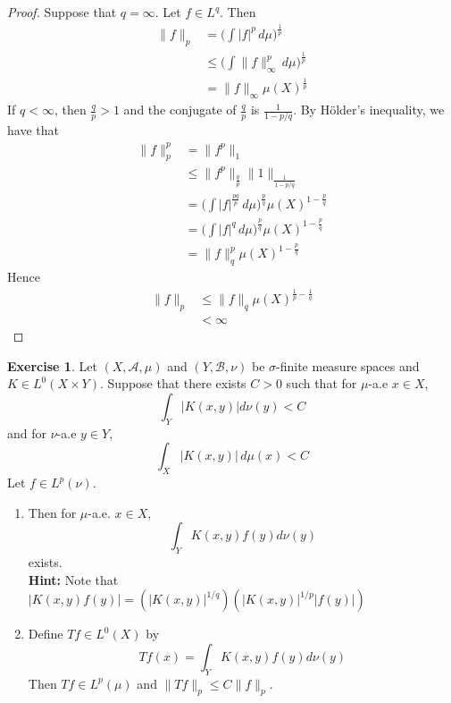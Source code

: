 \documentclass{book}
\theoremstyle{definition}
\newtheorem{ex}[definition]{Exercise}
\newcommand{\sig}{\sigma}
\newcommand{\MA}{\mathcal{A}}
\newcommand{\MB}{\mathcal{B}}
\newcommand{\lex}[1]{\label{ex:#1}}
\DeclareMathOperator*{\0}{\mbf{0}}
\DeclareMathOperator*{\1}{\mbf{1}}
\newcommand{\dmu}{\, d \mu}
\begin{document}
	\begin{proof}
		Suppose that $q = \infty$. Let $f \in L^q$. Then
		\begin{align*}
			\|f \|_p 
			&= \bigg(\int | f |^p \dmu \bigg)^{\frac{1}{p}} \\
			& \leq \bigg(\int \| f \|_{\infty} ^p \dmu \bigg)^{\frac{1}{p}} \\
			&= \|f \|_{\infty} \mu(X)^{\frac{1}{p}}
		\end{align*} 
		If $q < \infty$, then $\frac{q}{p} > 1$ and the conjugate of $\frac{q}{p}$ is $\frac{1}{1- p/q}$. By Hölder's inequality, we have that 
		\begin{align*}
			\|f \|_p^p 
			&= \|f^p \|_1 \\
			&\leq \|f^p \|_{\frac{q}{p}} \|1 \|_{\frac{1}{1-p/q}} \\
			&= \bigg(\int |f|^{\frac{pq}{p}} \dmu \bigg)^{\frac{p}{q}} \mu(X)^{1-\frac{p}{q}} \\
			&= \bigg(\int |f|^{q} \dmu \bigg)^{\frac{p}{q}}\mu(X)^{1-\frac{p}{q}} \\
			&= \|f \|_q^p\mu(X)^{1-\frac{p}{q}}
		\end{align*}
		Hence 
		\begin{align*}
			\|f \|_p 
			&\leq \|f \|_q\mu(X)^{\frac{1}{p}-\frac{1}{q}} \\
			&< \infty
		\end{align*}
	\end{proof}
	
	\begin{ex} \lex{00000} 
	Let $(X, \MA, \mu)$ and $(Y, \MB, \nu)$ be $\sig$-finite measure spaces and $K\in L^0(X \times Y)$. Suppose that there exists $C > 0$ such that for $\mu$-a.e $x \in X$, $$\int_Y |K(x, y)| d \nu(y) < C$$ and for $\nu$-a.e $y \in Y$, $$\int_X |K(x, y)| \dmu(x) < C$$
	Let $f \in L^p(\nu)$.
	\begin{enumerate}
	\item Then for $\mu$-a.e. $x \in X$, $$\int_Y K(x,y) f(y) d \nu(y)$$ exists. \\
	\textbf{Hint:} Note that $|K(x, y) f(y)| = (|K(x,y)|^{1/q})(|K(x,y)|^{1/p}|f(y)|)$
	\item Define $Tf \in L^0(X)$ by $$Tf(x) = \int_Y K(x, y) f(y)d \nu(y)$$ Then $Tf \in L^p(\mu)$ and $\|Tf\|_p \leq C\|f\|_p$. 
	\end{enumerate}
	\end{ex}
	
\end{document}
